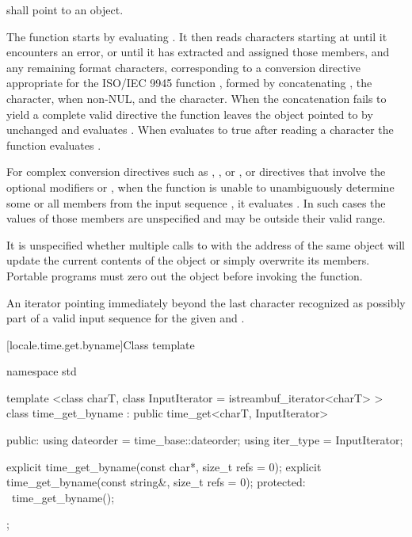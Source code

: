 \begin{itemdescr}
\pnum
\requires
{} shall point to an object.

\pnum
\effects The function starts by evaluating
. It
then reads characters starting at  until it encounters an error, or
until it has extracted and assigned those  members, and any
remaining format characters, corresponding to a conversion directive
appropriate for the ISO/IEC 9945 function , formed by
concatenating , the  character,
when non-NUL, and the 
character. When the concatenation fails to yield a complete valid
directive the function leaves the object pointed to by  unchanged and
evaluates . When 
evaluates to true after reading a character the function evaluates
.

\pnum
For complex conversion directives such as ,
, or , or directives
that involve the optional modifiers  or ,
when the function is unable
to unambiguously determine some or all  members from the input
sequence , it evaluates .
In such cases the values of those  members are unspecified
and may be outside their valid range.

\pnum
\remark It is unspecified whether multiple calls to
 with the
address of the same  object will update the current contents of
the object or simply overwrite its members. Portable programs must zero
out the object before invoking the function.

\pnum
\returns An iterator pointing immediately beyond the last character
recognized as possibly part of a valid input sequence for the given
 and .
\end{itemdescr}

[locale.time.get.byname]{Class template }

%
\begin{codeblock}
namespace std {
  template <class charT, class InputIterator = istreambuf_iterator<charT> >
  class time_get_byname : public time_get<charT, InputIterator> {
  public:
    using dateorder = time_base::dateorder;
    using iter_type = InputIterator;

    explicit time_get_byname(const char*, size_t refs = 0);
    explicit time_get_byname(const string&, size_t refs = 0);
  protected:
    ~time_get_byname();
  };
}
\end{codeblock}

